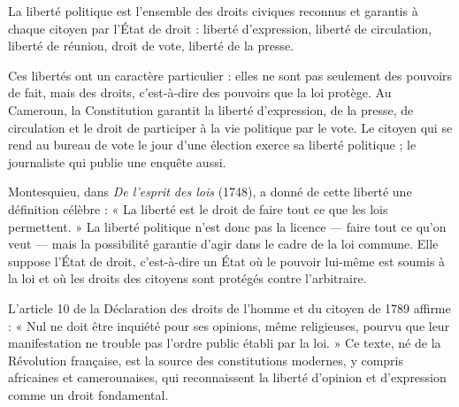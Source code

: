 \documentclass[11pt]{article}
\newcommand{\cle}[1]{{\popxbold\color{popdark}#1}}
\begin{document}
\begin{definition}
La \cle{liberté politique} est l'ensemble des droits civiques reconnus et garantis à chaque citoyen par l'État de droit : liberté d'expression, liberté de circulation, liberté de réunion, droit de vote, liberté de la presse.
\end{definition}

Ces libertés ont un caractère particulier : elles ne sont pas seulement des pouvoirs de fait, mais des \cle{droits}, c'est-à-dire des pouvoirs que la loi protège. Au Cameroun, la Constitution garantit la liberté d'expression, de la presse, de circulation et le droit de participer à la vie politique par le vote. Le citoyen qui se rend au bureau de vote le jour d'une élection exerce sa liberté politique ; le journaliste qui publie une enquête aussi.

Montesquieu, dans \emph{De l'esprit des lois} (1748), a donné de cette liberté une définition célèbre : « La liberté est le droit de faire tout ce que les lois permettent. » La liberté politique n'est donc pas la licence — faire tout ce qu'on veut — mais la possibilité garantie d'agir dans le cadre de la loi commune. Elle suppose l'\cle{État de droit}, c'est-à-dire un État où le pouvoir lui-même est soumis à la loi et où les droits des citoyens sont protégés contre l'arbitraire.

\begin{savaistu}
L'article 10 de la Déclaration des droits de l'homme et du citoyen de 1789 affirme : « Nul ne doit être inquiété pour ses opinions, même religieuses, pourvu que leur manifestation ne trouble pas l'ordre public établi par la loi. » Ce texte, né de la Révolution française, est la source des constitutions modernes, y compris africaines et camerounaises, qui reconnaissent la liberté d'opinion et d'expression comme un droit fondamental.
\end{savaistu}
\end{document}
